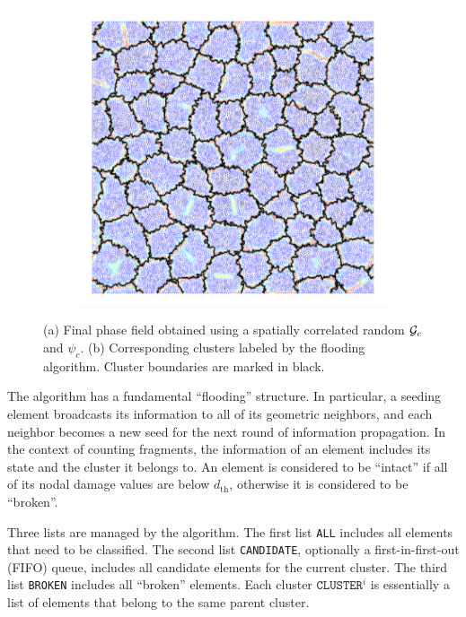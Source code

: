 \begin{figure}[htb!]
\begin{subfigure}[b]{0.36\textwidth}
    \includegraphics[width=\textwidth]{Appendices/figures/cluster.png}
    \vspace{-0.06in}
    \caption{}
  \end{subfigure}
  \caption{ (a) Final phase field obtained using a spatially correlated random ${\mathcal{G}_c}$ and $\psi_c$. (b) Corresponding clusters labeled by the flooding algorithm. Cluster boundaries are marked in black. }
  \label{fig: clustering}
\end{figure}

The algorithm has a fundamental ``flooding'' structure.  In particular, a seeding element broadcasts its information to all of its geometric neighbors, and each neighbor becomes a new seed for the next round of information propagation. In the context of counting fragments, the information of an element includes its state and the cluster it belongs to. An element is considered to be ``intact'' if all of its nodal damage values are below $d_{\text{th}}$, otherwise it is considered to be ``broken''.

Three lists are managed by the algorithm. The first list \texttt{ALL} includes all elements that need to be classified. The second list \texttt{CANDIDATE}, optionally a first-in-first-out (FIFO) queue, includes all candidate elements for the current cluster. The third list \texttt{BROKEN} includes all ``broken'' elements. Each cluster $\texttt{CLUSTER}^i$ is essentially a list of elements that belong to the same parent cluster.

